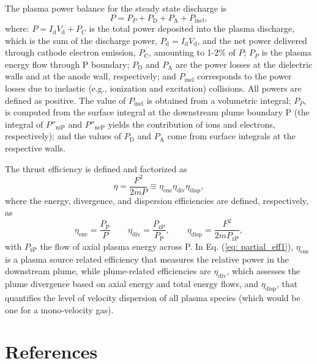 \documentclass[%
 aip,
cha,
 amsmath,amssymb,
 reprint,%
]{revtex4-1}
\begin{document}
The plasma power balance for the steady state discharge is
\begin{equation}
P = P_{P} + P_\mathrm{D} + P_\mathrm{A} + P_\mathrm{inel},
\label{eq: power_balance}
\end{equation}
where: $P = I_\mathrm{d} V_\mathrm{d} + P_\mathrm{C}$ is the total power deposited into the plasma discharge, which is the sum of the discharge power, $P_\mathrm{d} = I_\mathrm{d}V_\mathrm{d}$, and the net power delivered through cathode electron emission, $P_\mathrm{C}$, amounting to 1-2\% of $P$;
$P_{P}$ is the plasma energy flow through P boundary; $P_\mathrm{D}$ and $P_\mathrm{A}$ are the power losses at the dielectric walls and at the anode wall, respectively; and $P_\mathrm{inel}$ corresponds to the power losses due to inelastic (e.g., ionization and excitation) collisions. All powers are defined as positive. 
The value of $P_\mathrm{inel}$ is obtained from a volumetric integral; $P_{P}$, is computed from the surface integral at the downstream plume boundary P (the integral of $P''_\mathrm{niP}$ and $P''_\mathrm{neP}$ yields the contribution of ions and electrons, respectively); and the values of $P_\mathrm{D}$ and $P_\mathrm{A}$ come from surface integrals at the respective walls.

The thrust efficiency is defined and factorized as
\begin{equation}
\eta = \frac{F^2}{2\dot{m} P}
\equiv 
\eta_\mathrm{ene}\eta_\mathrm{div}\eta_\mathrm{disp},
\label{eq: thrust efficiency}
\end{equation}
where the energy, divergence, and dispersion efficiencies are defined, respectively, as
\begin{equation}
\eta_\mathrm{ene} =\frac{P_\mathrm{P}}{P}
\qquad
\eta_\mathrm{div} =\frac{P_\mathrm{zP}}{P_\mathrm{P}},
\qquad 
\eta_\mathrm{disp} = 
\frac{F^2}{2\dot{m} P_\mathrm{zP}},
\label{eq: partial_eff1}
\end{equation}
with $P_\mathrm{zP}$ the flow of axial plasma energy across P. In Eq. (\ref{eq: partial_eff1}), $\eta_\mathrm{ene}$ is a plasma source related efficiency that measures the relative power in the downstream plume, while plume-related efficiencies are $\eta_\mathrm{div}$, which assesses the plume divergence based on axial energy and total energy flows, and $\eta_\mathrm{disp}$, that quantifies the level of velocity dispersion of all plasma species (which would be one for a mono-velocity gas).



\section*{References}



\end{document}
